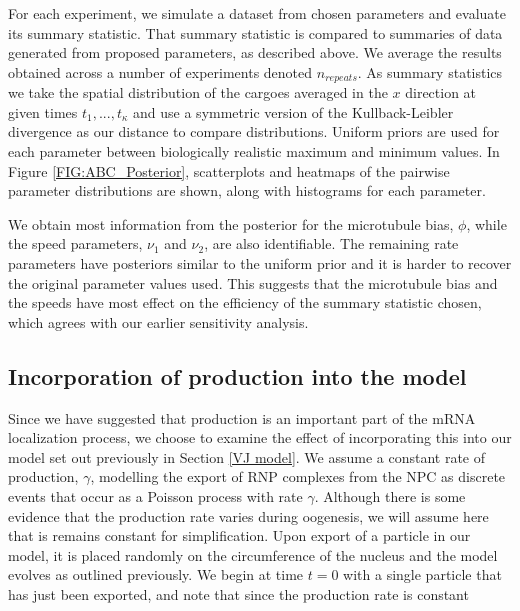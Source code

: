 \documentclass[twocolumn]{biophys}
\begin{document}
For each experiment, we simulate a dataset from chosen parameters and evaluate its summary statistic. 
That summary statistic is compared to summaries of data generated from proposed parameters, as described above.
We average the results obtained across a number of experiments denoted $n_{repeats}$.
As summary statistics we take the spatial distribution of the cargoes averaged in the $x$ direction at given times $t_1,...,t_{\kappa}$ and use a symmetric version of the Kullback-Leibler divergence as our distance to compare distributions.
Uniform priors are used for each parameter between biologically realistic maximum and minimum values.
In Figure \ref{FIG:ABC_Posterior}, scatterplots and heatmaps of the pairwise parameter distributions are shown, along with histograms for each parameter. 

We obtain most information from the posterior for the microtubule bias, $\phi$, while the speed parameters, $\nu_1$ and $\nu_2$, are also identifiable. 
The remaining rate parameters have posteriors similar to the uniform prior and it is harder to recover the original parameter values used.
This suggests that the microtubule bias and the speeds have most effect on the efficiency of the summary statistic chosen, which agrees with our earlier sensitivity analysis.

\subsection{Incorporation of production into the model}

Since we have suggested that production is an important part of the mRNA localization process, we choose to examine the effect of incorporating this into our model set out previously in Section \ref{VJ model}.
We assume a constant rate of production, $\gamma$, modelling the export of RNP complexes from the NPC as discrete events that occur as a Poisson process with rate $\gamma$.
Although there is some evidence that the production rate varies during oogenesis, we will assume here that is remains constant for simplification.
Upon export of a particle in our model, it is placed randomly on the circumference of the nucleus and the model evolves as outlined previously.
We begin at time $t=0$ with a single particle that has just been exported, and note that since the production rate is constant 
\end{document}
